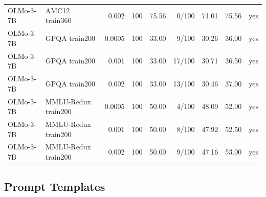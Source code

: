 \documentclass{article}
\begin{document}
\begin{table}[t]
{\begin{tabular}{llrrrrrrr}
OLMo-3-7B & AMC12 train360 & 0.002 & 100 & 75.56 & 0/100 & 71.01 & 75.56 & yes \\
OLMo-3-7B & GPQA train200 & 0.0005 & 100 & 33.00 & 9/100 & 30.26 & 36.00 & yes \\
OLMo-3-7B & GPQA train200 & 0.001 & 100 & 33.00 & 17/100 & 30.71 & 36.50 & yes \\
OLMo-3-7B & GPQA train200 & 0.002 & 100 & 33.00 & 13/100 & 30.46 & 37.00 & yes \\
OLMo-3-7B & MMLU-Redux train200 & 0.0005 & 100 & 50.00 & 4/100 & 48.09 & 52.00 & yes \\
OLMo-3-7B & MMLU-Redux train200 & 0.001 & 100 & 50.00 & 8/100 & 47.92 & 52.50 & yes \\
OLMo-3-7B & MMLU-Redux train200 & 0.002 & 100 & 50.00 & 9/100 & 47.16 & 53.00 & yes \\
\bottomrule
\end{tabular}
}
\label{tab:seed_profiling_details}
\end{table}

\subsection{Prompt Templates}
\label{app:prompts}
\end{document}
